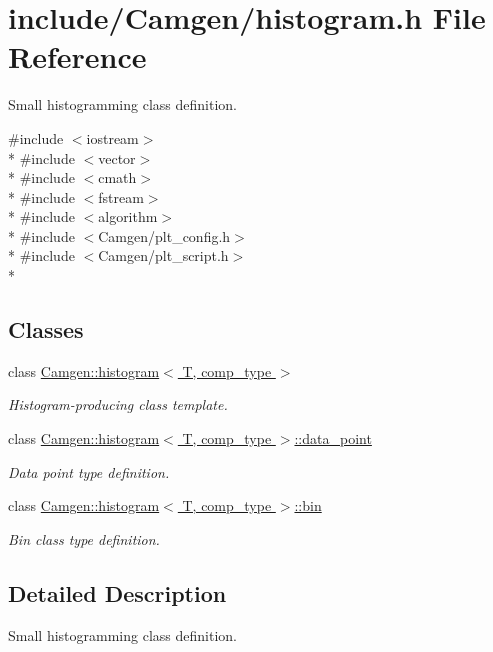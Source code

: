 \hypertarget{a00665}{}\section{include/\+Camgen/histogram.h File Reference}
\label{a00665}


Small histogramming class definition.  


{\ttfamily \#include $<$iostream$>$}\\*
{\ttfamily \#include $<$vector$>$}\\*
{\ttfamily \#include $<$cmath$>$}\\*
{\ttfamily \#include $<$fstream$>$}\\*
{\ttfamily \#include $<$algorithm$>$}\\*
{\ttfamily \#include $<$Camgen/plt\+\_\+config.\+h$>$}\\*
{\ttfamily \#include $<$Camgen/plt\+\_\+script.\+h$>$}\\*
\subsection*{Classes}
\begin{DoxyCompactItemize}
\item 
class \hyperlink{a00284}{Camgen\+::histogram$<$ T, comp\+\_\+type $>$}
\begin{DoxyCompactList}\small\item\em Histogram-\/producing class template. \end{DoxyCompactList}\item 
class \hyperlink{a00114}{Camgen\+::histogram$<$ T, comp\+\_\+type $>$\+::data\+\_\+point}
\begin{DoxyCompactList}\small\item\em Data point type definition. \end{DoxyCompactList}\item 
class \hyperlink{a00021}{Camgen\+::histogram$<$ T, comp\+\_\+type $>$\+::bin}
\begin{DoxyCompactList}\small\item\em Bin class type definition. \end{DoxyCompactList}\end{DoxyCompactItemize}


\subsection{Detailed Description}
Small histogramming class definition. 


